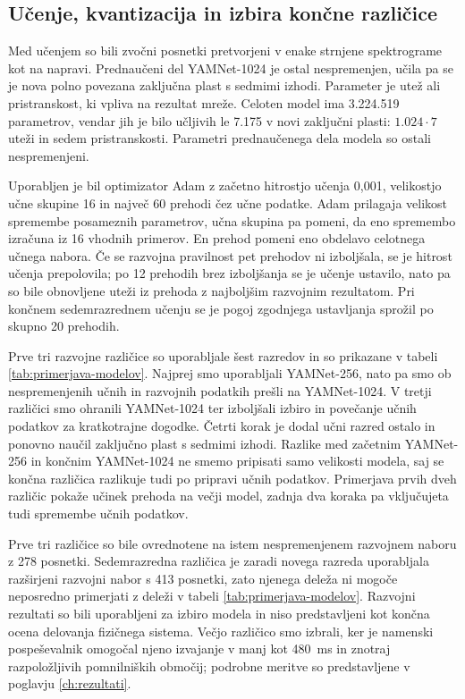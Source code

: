 \subsection{Učenje, kvantizacija in izbira končne različice}

Med učenjem so bili zvočni posnetki pretvorjeni v enake strnjene spektrograme
kot na napravi. Prednaučeni del YAMNet-1024 je ostal
nespremenjen, učila pa se je nova polno povezana zaključna plast s sedmimi
izhodi. Parameter je utež ali pristranskost, ki vpliva na rezultat mreže.
Celoten model ima 3.224.519 parametrov, vendar jih je bilo učljivih le 7.175 v
novi zaključni plasti: $1.024 \cdot 7$ uteži in sedem pristranskosti. Parametri
prednaučenega dela modela so ostali nespremenjeni.

Uporabljen je bil optimizator Adam \cite{kingma2015adam} z začetno hitrostjo učenja 0,001, velikostjo
učne skupine 16 in največ 60 prehodi čez učne podatke. Adam prilagaja velikost
spremembe posameznih parametrov, učna skupina pa pomeni, da eno spremembo
izračuna iz 16 vhodnih primerov. En prehod pomeni eno obdelavo celotnega
učnega nabora. Če se razvojna pravilnost pet prehodov ni izboljšala, se je
hitrost učenja prepolovila; po 12 prehodih brez izboljšanja se je učenje
ustavilo, nato pa so bile obnovljene uteži iz prehoda z najboljšim razvojnim
rezultatom. Pri končnem sedemrazrednem učenju se je pogoj zgodnjega ustavljanja
sprožil po skupno 20 prehodih.

Prve tri razvojne različice so uporabljale šest razredov in so prikazane v
tabeli \ref{tab:primerjava-modelov}. Najprej smo uporabljali YAMNet-256, nato
pa smo ob nespremenjenih učnih in razvojnih podatkih prešli na YAMNet-1024. V
tretji različici smo ohranili YAMNet-1024 ter izboljšali izbiro in povečanje
učnih podatkov za kratkotrajne dogodke. Četrti korak je dodal učni razred ostalo
in ponovno naučil zaključno plast s sedmimi izhodi.
Razlike med začetnim YAMNet-256 in končnim YAMNet-1024 ne smemo pripisati samo
velikosti modela, saj se končna različica razlikuje tudi po pripravi učnih
podatkov. Primerjava prvih dveh različic pokaže učinek prehoda na večji model,
zadnja dva koraka pa vključujeta tudi spremembe učnih podatkov.

Prve tri različice so bile ovrednotene na istem nespremenjenem razvojnem naboru
z 278 posnetki. Sedemrazredna različica je zaradi novega razreda uporabljala
razširjeni razvojni nabor s 413 posnetki, zato njenega deleža ni mogoče
neposredno primerjati z deleži v tabeli \ref{tab:primerjava-modelov}.
Razvojni rezultati so bili uporabljeni za izbiro modela in niso
predstavljeni kot končna ocena delovanja fizičnega sistema. Večjo različico smo
izbrali, ker je namenski pospeševalnik omogočal njeno izvajanje v manj kot
\SI{480}{\milli\second} in znotraj razpoložljivih pomnilniških območij;
podrobne meritve so predstavljene v
poglavju \ref{ch:rezultati}.

